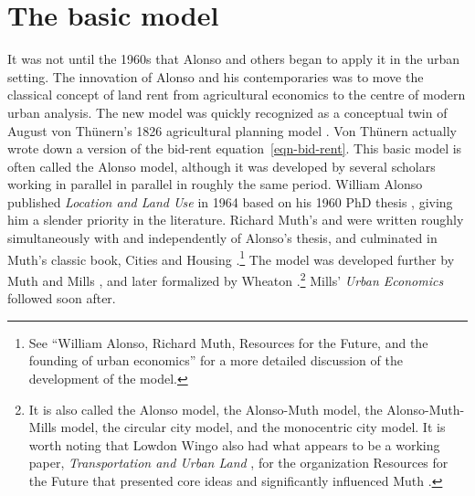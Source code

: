 \section{The basic model}
It was not until the 1960s that Alonso and others began to apply it in the urban setting.  The innovation of Alonso and his contemporaries was to move the classical concept of land rent from agricultural economics to the centre of modern urban analysis. 
The new model was quickly recognized as a conceptual twin of August von Th\"unern's 1826 agricultural planning model \cite{vonthunenIsolirteStaatBeziehung1826}. Von Th\"unern actually wrote down a version of the bid-rent equation~\ref{eqn-bid-rent}.
This basic model is often called the Alonso model, although it was developed by several scholars working in parallel in parallel in roughly the same period. William Alonso published \textit{Location and Land Use} in 1964  \cite{alonsoLocationLandUse1964} based on his 1960 PhD thesis \cite{alonsoModelUrbanLand1960},  
giving him a slender priority in the literature. 
Richard Muth's \cite{muthSpatialStructureHousing1961} and \cite{muthRationalExpectationsTheory1961} were written roughly simultaneously with and independently of Alonso's thesis, and culminated in Muth's classic book, Cities and Housing  \cite{muthCitiesHousingSpatial1969}.\footnote{See ``William Alonso, Richard Muth, Resources for  the Future, and the founding of urban economics''\cite{mcdonaldWilliamAlonsoRichard2007} for a more detailed discussion of the development of the model.}  %
 The model was developed further by Muth \cite{muthCitiesHousingSpatial1969} and Mills \cite{millsAggregativeModelResource1967}, and later formalized by Wheaton \cite{wheatonComparativeStaticAnalysis1974}.\footnote{It is also called the Alonso model, the Alonso-Muth model, the Alonso-Muth-Mills model, the circular city model, and the monocentric city model. %
It is worth noting that Lowdon Wingo also had what appears to be a working paper, \textit{Transportation and Urban Land} \cite{wingoTransportationUrbanLand1961}, for the organization Resources for the Future %
that presented core ideas and significantly influenced Muth \cite{mcdonaldWilliamAlonsoRichard2007}.} Mills' \textit{Urban Economics} \cite{millsUrbanEconomics1972} followed soon after. 

